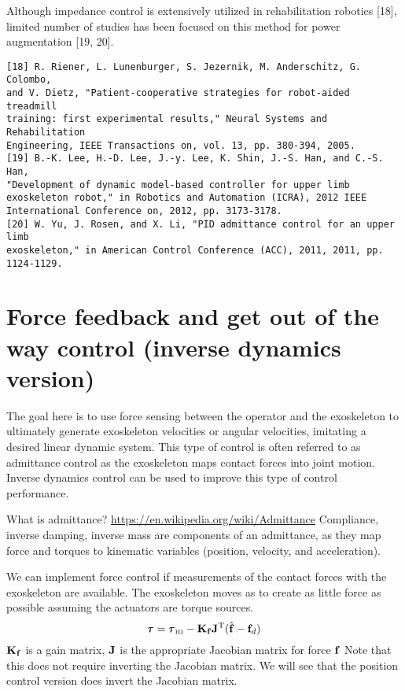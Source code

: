 \documentclass[letterpaper,12pt,fullpage]{article}
\newcommand{\invdyn}{{\mbox {\tiny ID}}}
\begin{document}
Although impedance control is extensively utilized in rehabilitation
robotics [18], limited number of studies has been focused on
this method for power augmentation [19, 20].
\begin{verbatim}
[18] R. Riener, L. Lunenburger, S. Jezernik, M. Anderschitz, G. Colombo,
and V. Dietz, "Patient-cooperative strategies for robot-aided treadmill
training: first experimental results," Neural Systems and Rehabilitation
Engineering, IEEE Transactions on, vol. 13, pp. 380-394, 2005.
[19] B.-K. Lee, H.-D. Lee, J.-y. Lee, K. Shin, J.-S. Han, and C.-S. Han,
"Development of dynamic model-based controller for upper limb
exoskeleton robot," in Robotics and Automation (ICRA), 2012 IEEE
International Conference on, 2012, pp. 3173-3178.
[20] W. Yu, J. Rosen, and X. Li, "PID admittance control for an upper limb
exoskeleton," in American Control Conference (ACC), 2011, 2011, pp.
1124-1129.
\end{verbatim}

\section{Force feedback and get out of the way control (inverse dynamics version)}

The goal here is to use force sensing between the operator and the
exoskeleton to ultimately generate exoskeleton velocities or angular velocities,
imitating a desired linear dynamic system.
This type of control is often referred to as admittance control as the
exoskeleton maps contact forces into joint motion.
Inverse dynamics control
can be used to improve this type of control performance.

What is admittance?
\url{https://en.wikipedia.org/wiki/Admittance}
Compliance, inverse damping, inverse mass are components of an admittance,
as they map force and torques to kinematic variables (position, velocity, and
acceleration). 

We can implement force control 
if measurements of the contact forces with
the exoskeleton are available.
The exoskeleton moves as to create as little force as possible 
assuming the actuators are torque sources.
\begin{equation}
\vtau = \vtau_{\invdyn} - \mK_{\vf} \mJ^{\tr} ( \hat{\vf} - \vf_d )
\end{equation}
${\bf K}_{{\bf f}}$ is a gain matrix, ${\bf J}$ is the appropriate Jacobian matrix for
force ${\bf f}$
Note that this does not require inverting the Jacobian matrix.
We will see that the position control version does invert the Jacobian matrix.
\end{document}
